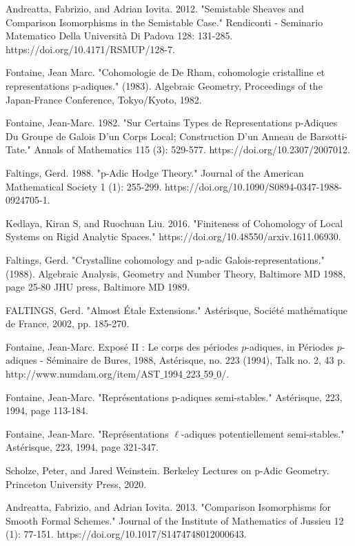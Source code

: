 \documentclass[12pt]{book}
\theoremstyle{definition}
\begin{document}
\begin{thebibliography}{10}
 Andreatta, Fabrizio, and Adrian Iovita. 2012. "Semistable Sheaves and Comparison Isomorphisms in the Semistable Case." Rendiconti - Seminario Matematico Della Universit\`a Di Padova 128: 131-285. https://doi.org/10.4171/RSMUP/128-7.

 Fontaine, Jean Marc. "Cohomologie de De Rham, cohomologie cristalline et representations p-adiques." (1983). Algebraic Geometry, Proceedings of the Japan-France Conference, Tokyo/Kyoto, 1982.

 Fontaine, Jean-Marc. 1982. "Sur Certains Types de Representations p-Adiques Du Groupe de Galois D'un Corps Local; Construction D'un Anneau de Barsotti-Tate." Annals of Mathematics 115 (3): 529-577. https://doi.org/10.2307/2007012.

 Faltings, Gerd. 1988. "p-Adic Hodge Theory." Journal of the American Mathematical Society 1 (1): 255-299. https://doi.org/10.1090/S0894-0347-1988-0924705-1.

 Kedlaya, Kiran S, and Ruochuan Liu. 2016. "Finiteness of Cohomology of Local Systems on Rigid Analytic Spaces." https://doi.org/10.48550/arxiv.1611.06930.

 Faltings, Gerd. "Crystalline cohomology and p-adic Galois-representations." (1988). Algebraic Analysis, Geometry and Number Theory, Baltimore MD 1988, page 25-80 JHU press, Baltimore MD 1989.

 FALTINGS, Gerd. "Almost \'Etale Extensions." Ast\'erisque, Soci\'et\'e math\'ematique de France, 2002, pp. 185-270.

 Fontaine, Jean-Marc. Expos\'e II : Le corps des p\'eriodes $p$-adiques, in P\'eriodes $p$-adiques - S\'eminaire de Bures, 1988, Astérisque, no. 223 (1994), Talk no. 2, 43 p. http://www.numdam.org/item/AST$\_$1994$\_$223$\_$59$\_$0/.

 Fontaine, Jean-Marc. "Repr\'esentations p-adiques semi-stables." Ast\'erisque, 223, 1994, page 113-184.

 Fontaine, Jean-Marc. "Repr\'esentations $\ell$-adiques potentiellement semi-stables." Ast\'erisque, 223, 1994, page 321-347.

 Scholze, Peter, and Jared Weinstein. Berkeley Lectures on p-Adic Geometry. Princeton University Press, 2020.

 Andreatta, Fabrizio, and Adrian Iovita. 2013. "Comparison Isomorphisms for Smooth Formal Schemes." Journal of the Institute of Mathematics of Jussieu 12 (1): 77-151. https://doi.org/10.1017/S1474748012000643.



\end{thebibliography}
 






	
\end{document}
